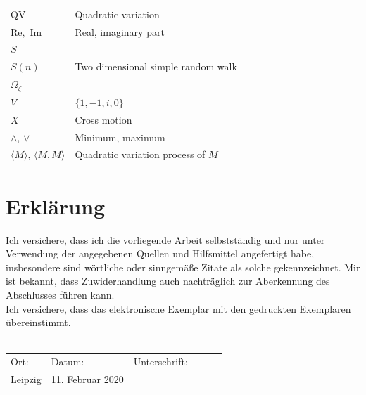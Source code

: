 \documentclass[11pt]{article}
\numberwithin{equation}{section}
\begin{document}
\begin{tabular}{L{4cm} L{9cm}}
  QV & Quadratic variation \\
  $\text{Re},$ $\text{Im}$ & Real, imaginary part \\
  $S$  & \pageref{D: set S}\\
  $S(n)$ & Two dimensional simple random walk \pageref{D: random walk} \\
  $\Omega_{\zeta}$ & \pageref{D: OZ}\\
  $V$ & $\{1,-1,i,0\}$ \pageref{D: V}\\
  $X$ & Cross motion \pageref{D: cross motion X}\\
  $\land$, $\lor$ & Minimum, maximum \\
  $\langle M \rangle$, $\langle M,M \rangle$  & Quadratic variation process of $M$ \pageref{D: QV} \\
\end{tabular}


\newpage
{}


\newpage
{}
\section*{Erklärung} 
Ich versichere, dass ich die vorliegende 
Arbeit selbstständig und nur unter Verwendung 
der angegebenen Quellen und Hilfsmittel 
angefertigt habe, insbesondere sind wörtliche 
oder sinngemäße Zitate als solche gekennzeichnet.
 Mir ist bekannt, dass Zuwiderhandlung auch 
 nachträglich zur Aberkennung des Abschlusses führen kann.\\
Ich versichere, dass das elektronische Exemplar mit den 
gedruckten Exemplaren übereinstimmt.
\\~\\
\begin{tabularx}{\columnwidth}{XlXcXr}
Ort: & Datum: & \hspace{2cm} Unterschrift:\\
Leipzig & 11. Februar 2020 &  \\
\end{tabularx}
\end{document}
